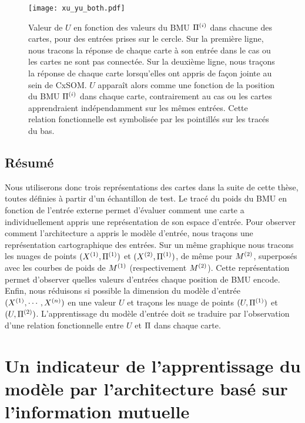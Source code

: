 \begin{figure}
\centering
\texttt{[image: xu\_yu\_both.pdf]}
\caption{Valeur de $U$ en fonction des valeurs du BMU $\Pi^{({i})}$ dans chacune des cartes, pour des entrées prises sur le cercle. Sur la première ligne, nous tracons la réponse de chaque carte à son entrée dans le cas ou les cartes ne sont pas connectée. Sur la deuxième ligne, nous traçons la réponse de chaque carte lorsqu'elles ont appris de façon jointe au sein de CxSOM.
$U$ apparaît alors comme une fonction de la position du BMU $\Pi^{({i})}$ dans chaque carte, contrairement au cas ou les cartes apprendraient indépendamment sur les mêmes entrées. Cette relation fonctionnelle est symbolisée par les pointillés sur les tracés du bas.}
\label{fig:piu}
\end{figure}

\subsection{Résumé}
Nous utiliserons donc trois représentations des cartes dans la suite de cette thèse, toutes définies à partir d'un échantillon de test.
Le tracé du poids du BMU en fonction de l'entrée externe permet d'évaluer comment une carte a individuellement appris une représentation de son espace d'entrée. 
Pour observer comment l'architecture a appris le modèle d'entrée, nous traçons une représentation cartographique des entrées. Sur un même graphique nous tracons les nuages de points $(X^{({1})},\Pi^{({1})})$ et $(X^{({2})},\Pi^{({1})})$, de même pour $M^{({2})}$, superposés avec les courbes de poids de $M^{({1})}$ (respectivement $M^{({2})}$). Cette représentation permet d'observer quelles valeurs d'entrées chaque position de BMU encode.
Enfin, nous réduisons si possible la dimension du modèle d'entrée $(X^{({1})},\cdots,X^{({n})})$ en une valeur $U$ et traçons les nuage de points $(U,\Pi^{({1})})$ et $(U,\Pi^{({2})})$. L'apprentissage du modèle d'entrée doit se traduire par l'observation d'une relation fonctionnelle entre $U$ et $\Pi$ dans chaque carte.

\section{Un indicateur de l'apprentissage du modèle par l'architecture basé sur l'information mutuelle}

